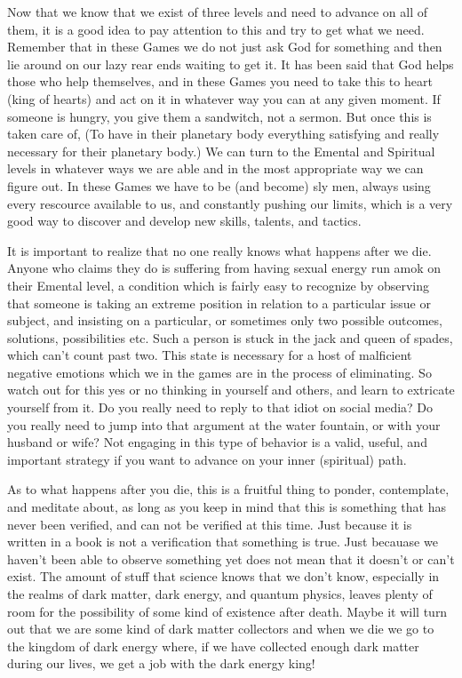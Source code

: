 \documentclass[12pt,letterpaper]{book}
\begin{document}
Now that we know that we exist of three levels and need to advance on all of them, it is a good idea to pay attention to this and try to get what we need. Remember that in these Games we do not just ask God for something and then lie around on our lazy rear ends waiting to get it. It has been said that God helps those who help themselves, and in these Games you need to take this to heart (king of hearts) and act on it in whatever way you can at any given moment. If someone is hungry, you give them a sandwitch, not a sermon. But once this is taken care of, (To have in their planetary body everything satisfying and really necessary for their planetary body.) We can turn to the Emental and Spiritual levels in whatever ways we are able and in the most appropriate way we can figure out. In these Games we have to be (and become) sly men, always using every rescource available to us, and constantly pushing our limits, which is a very good way to discover and develop new skills, talents, and tactics.

It is important to realize that no one really knows what happens after we die. Anyone who claims they do is suffering from having sexual energy run amok on their Emental level, a condition which is fairly easy to recognize by observing that someone is taking an extreme position in relation to a particular issue or subject, and insisting on a particular, or sometimes only two possible outcomes, solutions, possibilities etc. Such a person is stuck in the jack and queen of spades, which can't count past two. This state is necessary for a host of malficient negative emotions which we in the games are in the process of eliminating. So watch out for this yes or no thinking in yourself and others, and learn to extricate yourself from it. Do you really need to reply to that idiot on social media? Do you really need to jump into that argument at the water fountain, or with your husband or wife? Not engaging in this type of behavior is a valid, useful, and important strategy if you want to advance on your inner (spiritual) path.

As to what happens after you die, this is a fruitful thing to ponder, contemplate, and meditate about, as long as you keep in mind that this is something that has never been verified, and can not be verified at this time. Just because it is written in a book is not a verification that something is true. Just becauase we haven't been able to observe something yet does not mean that it doesn't or can't exist. The amount of stuff that science knows that we don't know, especially in the realms of dark matter, dark energy, and quantum physics, leaves plenty of room for the possibility of some kind of existence after death. Maybe it will turn out that we are some kind of dark matter collectors and when we die we go to the kingdom of dark energy where, if we have collected enough dark matter during our lives, we get a job with the dark energy king!
\end{document}

